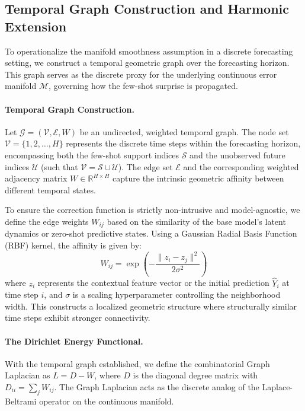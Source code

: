 \documentclass{article}
\begin{document}
	\subsection{Temporal Graph Construction and Harmonic Extension}

To operationalize the manifold smoothness assumption in a discrete forecasting setting, we construct a temporal geometric graph over the forecasting horizon. This graph serves as the discrete proxy for the underlying continuous error manifold $\mathcal{M}$, governing how the few-shot surprise is propagated.

\paragraph{Temporal Graph Construction.} Let $\mathcal{G} = (\mathcal{V}, \mathcal{E}, W)$ be an undirected, weighted temporal graph. The node set $\mathcal{V} = \{1, 2, \dots, H\}$ represents the discrete time steps within the forecasting horizon, encompassing both the few-shot support indices $\mathcal{S}$ and the unobserved future indices $\mathcal{U}$ (such that $\mathcal{V} = \mathcal{S} \cup \mathcal{U}$). The edge set $\mathcal{E}$ and the corresponding weighted adjacency matrix $W \in \mathbb{R}^{H \times H}$ capture the intrinsic geometric affinity between different temporal states.

To ensure the correction function is strictly non-intrusive and model-agnostic, we define the edge weights $W_{ij}$ based on the similarity of the base model's latent dynamics or zero-shot predictive states. Using a Gaussian Radial Basis Function (RBF) kernel, the affinity is given by:
\begin{equation}
    W_{ij} = \exp\left(-\frac{\|z_i - z_j\|^2}{2\sigma^2}\right)
\end{equation}
where $z_i$ represents the contextual feature vector or the initial prediction $\hat{Y}_i$ at time step $i$, and $\sigma$ is a scaling hyperparameter controlling the neighborhood width. This constructs a localized geometric structure where structurally similar time steps exhibit stronger connectivity.

\paragraph{The Dirichlet Energy Functional.} With the temporal graph established, we define the combinatorial Graph Laplacian as $L = D - W$, where $D$ is the diagonal degree matrix with $D_{ii} = \sum_{j} W_{ij}$. The Graph Laplacian acts as the discrete analog of the Laplace-Beltrami operator on the continuous manifold.
\end{document}
